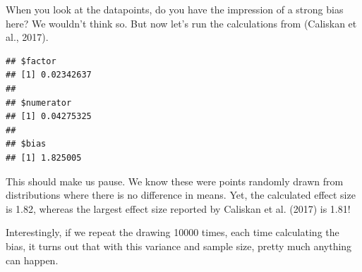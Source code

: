 \documentclass[10pt,dvipsnames,enabledeprecatedfontcommands]{scrartcl}
\newenvironment{Shaded}{\begin{snugshade}}{\end{snugshade}}
\newcommand{\KeywordTok}[1]{\textcolor[rgb]{0.13,0.29,0.53}{\textbf{#1}}}
\newcommand{\DataTypeTok}[1]{\textcolor[rgb]{0.13,0.29,0.53}{#1}}
\newcommand{\StringTok}[1]{\textcolor[rgb]{0.31,0.60,0.02}{#1}}
\newcommand{\ControlFlowTok}[1]{\textcolor[rgb]{0.13,0.29,0.53}{\textbf{#1}}}
\newcommand{\OperatorTok}[1]{\textcolor[rgb]{0.81,0.36,0.00}{\textbf{#1}}}
\newcommand{\NormalTok}[1]{#1}
\begin{document}
\noindent When you look at the datapoints, do you have the impression of
a strong bias here? We wouldn't think so. But now let's run the
calculations from (Caliskan et al., 2017).

\vspace{1mm} \footnotesize

\begin{Shaded}
\end{Shaded}

\begin{verbatim}
## $factor
## [1] 0.02342637
## 
## $numerator
## [1] 0.04275325
## 
## $bias
## [1] 1.825005
\end{verbatim}

\normalsize

\noindent This should make us pause. We know these were points randomly
drawn from distributions where there is no difference in means. Yet, the
calculated effect size is 1.82, whereas the largest effect size reported
by Caliskan et al. (2017) is 1.81!

Interestingly, if we repeat the drawing 10000 times, each time
calculating the bias, it turns out that with this variance and sample
size, pretty much anything can happen.

\vspace{1mm} \footnotesize
\end{document}
